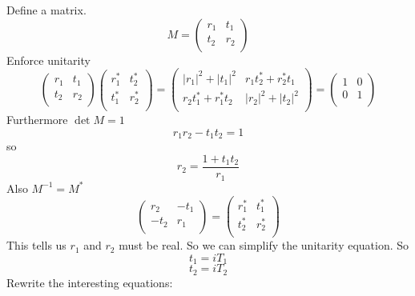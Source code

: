 Define a matrix.
\begin{equation}
M = \begin{pmatrix}
r_1 & t_1 \\
t_2 & r_2 \\
\end{pmatrix}
\end{equation}
Enforce unitarity
\begin{equation}
\begin{pmatrix}
r_1 & t_1 \\
t_2 & r_2 \\
\end{pmatrix}
\begin{pmatrix}
r^*_1 & t^*_2 \\
t^*_1 & r^*_2 \\
\end{pmatrix}
=
\begin{pmatrix}
|r_1|^2+|t_1|^2 & r_1t^*_2+r^*_2t_1 \\
r_2t^*_1+r^*_1t_2 & |r_2|^2+|t_2|^2 \\
\end{pmatrix}=
\begin{pmatrix}
1 & 0 \\
0 & 1 \\
\end{pmatrix}
\end{equation}
Furthermore $\det{M}=1$
\begin{equation}
r_1r_2-t_1t_2=1
\end{equation}
so 
\begin{equation}
r_2=\frac{1+t_1t_2}{r_1}
\end{equation}
Also $M^{-1}=M^*$
\begin{equation}
\begin{pmatrix}
r_2 & -t_1 \\
-t_2 & r_1 \\
\end{pmatrix}=
\begin{pmatrix}
r^*_1 & t^*_1 \\
t^*_2 & r^*_2 \\
\end{pmatrix}
\end{equation}
This tells us $r_1$ and $r_2$ must be real.
So we can simplify the unitarity equation. 
So
\begin{equation}
t_1=iT_1
\end{equation}
\begin{equation}
t_2=iT_2
\end{equation}
Rewrite the interesting equations:
